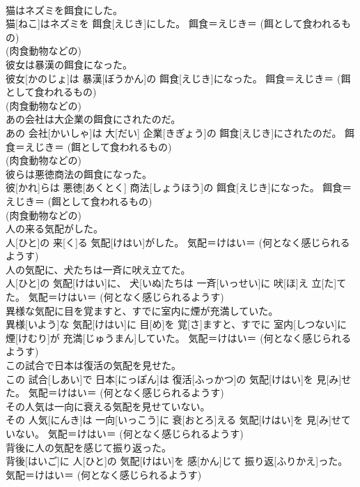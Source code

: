 \documentclass[8pt]{extreport}
\begin{document}
\begin{CJK}{UTF8}{min}
{\\	猫はネズミを餌食にした。	
\\	猫[ねこ]はネズミを 餌食[えじき]にした。	餌食＝えじき＝ (餌として食われるもの) 
\\	(肉食動物などの) 
\\	彼女は暴漢の餌食になった。	
\\	彼女[かのじょ]は 暴漢[ぼうかん]の 餌食[えじき]になった。	餌食＝えじき＝ (餌として食われるもの) 
\\	(肉食動物などの) 
\\	あの会社は大企業の餌食にされたのだ。	
\\	あの 会社[かいしゃ]は 大[だい] 企業[きぎょう]の 餌食[えじき]にされたのだ。	餌食＝えじき＝ (餌として食われるもの) 
\\	(肉食動物などの) 
\\	彼らは悪徳商法の餌食になった。	
\\	彼[かれ]らは 悪徳[あくとく] 商法[しょうほう]の 餌食[えじき]になった。	餌食＝えじき＝ (餌として食われるもの) 
\\	(肉食動物などの) 
\\	人の来る気配がした。	
\\	人[ひと]の 来[く]る 気配[けはい]がした。	気配＝けはい＝ (何となく感じられるようす) 
\\	人の気配に、犬たちは一斉に吠え立てた。	
\\	人[ひと]の 気配[けはい]に、 犬[いぬ]たちは 一斉[いっせい]に 吠[ほ]え 立[た]てた。	気配＝けはい＝ (何となく感じられるようす) 
\\	異様な気配に目を覚ますと、すでに室内に煙が充満していた。	
\\	異様[いよう]な 気配[けはい]に 目[め]を 覚[さ]ますと、すでに 室内[しつない]に 煙[けむり]が 充満[じゅうまん]していた。	気配＝けはい＝ (何となく感じられるようす) 
\\	この試合で日本は復活の気配を見せた。	
\\	この 試合[しあい]で 日本[にっぽん]は 復活[ふっかつ]の 気配[けはい]を 見[み]せた。	気配＝けはい＝ (何となく感じられるようす) 
\\	その人気は一向に衰える気配を見せていない。	
\\	その 人気[にんき]は 一向[いっこう]に 衰[おとろ]える 気配[けはい]を 見[み]せていない。	気配＝けはい＝ (何となく感じられるようす) 
\\	背後に人の気配を感じて振り返った。	
\\	背後[はいご]に 人[ひと]の 気配[けはい]を 感[かん]じて 振り返[ふりかえ]った。	気配＝けはい＝ (何となく感じられるようす) 
}
\end{CJK}
\end{document}
